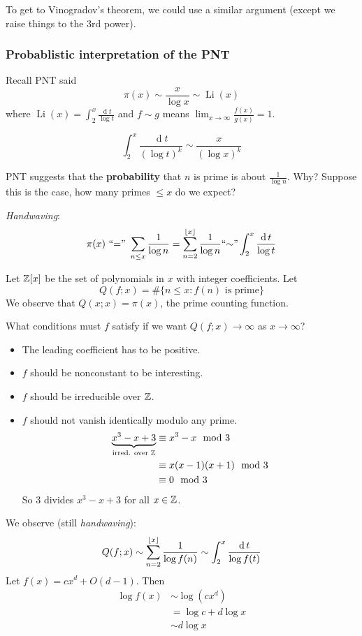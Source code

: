 \documentclass[12pt]{article}
\renewcommand{\d}{\ensuremath{\operatorname{d}}}
\begin{document}
To get to Vinogradov's theorem, we could use a similar argument (except we raise things to the 3rd power).

\subsubsection{Probablistic interpretation of the PNT}
Recall PNT said \[\pi(x)\sim \frac{x}{\log x} \sim \operatorname{Li}(x)\] where $\operatorname{Li}(x)=\int_{2}^{x}\frac{\d t}{\log t}$ and $f\sim g$ means $\lim_{x\to\infty}\frac{f(x)}{g(x)}=1$.

\rmk \[\int_{2}^{x}\frac{\d t}{(\log t)^k}\sim \frac{x}{(\log x)^k}\]

PNT suggests that the \textbf{probability} that $n$ is prime is about $\frac{1}{\log n}$. Why? Suppose this is the case, how many primes $\leq x$ do we expect?

\textit{Handwaving}: \[\pi(x) \text{ ``='' } \sum_{n\leq x}\frac{1}{\log n} = \sum_{n=2}^{\floor{x}} \frac{1}{\log n}\text{``$\sim$''} \int_{2}^{x}\frac{\d t}{\log t}\]

Let $\mathbb{Z}[x]$ be the set of polynomials in $x$ with integer coefficients.
Let \[Q(f;x) = \# \{n\leq x: f(n) \text{ is prime}\}\]
We observe that $Q(x;x)=\pi(x)$, the prime counting function. 

What conditions must $f$ satisfy if we want $Q(f;x)\to \infty$ as $x\to \infty$? \begin{itemize}
    \item The leading coefficient has to be positive.
    \item $f$ should be nonconstant to be interesting.
    \item $f$ should be irreducible over $\mathbb{Z}$.
    \item $f$ should not vanish identically modulo any prime.
    \noneg \begin{align*}
        \underbrace{x^3-x+3}_{\text{irred. over }\mathbb{Z}} &\equiv x^3-x\mod 3\\
        &\equiv x(x-1)(x+1)\mod 3\\
        &\equiv 0\mod 3
    \end{align*}
    So 3 divides $x^3-x+3$ for all $x\in \mathbb{Z}$.
\end{itemize}
We observe (still \textit{handwaving}):
\[Q(f;x) \sim \sum_{n=2}^{\floor{x}}\frac{1}{\log f(n)}\sim \int_{2}^{x}\frac{\d t}{\log f(t)}\]
Let $f(x)=cx^d+O(d-1)$. Then \begin{align*}
    \log f(x) &\sim \log (cx^d)\\
    &= \log c + d\log x\\
    &\sim d \log x
\end{align*}
\end{document}

